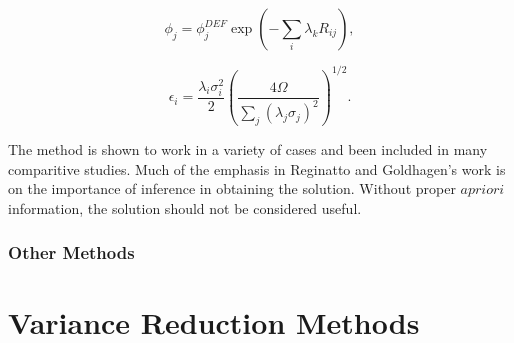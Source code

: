 \begin{equation}\label{eqn:maxed-flux}
\phi_j = \phi_j^{DEF} \exp(- \sum_i \lambda_k R_{ij}) ,
\end{equation}

\begin{equation}\label{eqn:maxed-error}
\epsilon_i = \frac{\lambda_i \sigma_i^2}{2} (\frac{4 \Omega}{\sum_j (\lambda_j \sigma_j)^2})^{1/2} .
\end{equation}

The method is shown to work in a variety of cases and been included in many comparitive studies.
Much of the emphasis in Reginatto and Goldhagen's work is on the importance of inference in obtaining the solution.
Without proper $a priori$ information, the solution should not be considered useful.



\subsubsection{Other Methods}


\section{Variance Reduction Methods}


